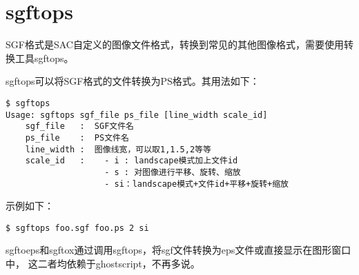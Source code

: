 \section{sgftops}
\label{sec:sgftops}
\label{sec:sgftoeps}
\label{sec:sgftox}

SGF格式是SAC自定义的图像文件格式，转换到常见的其他图像格式，需要使用转换工具sgftops。

sgftops可以将SGF格式的文件转换为PS格式。其用法如下：
\begin{lstlisting}[style=Shell]
$ sgftops
Usage: sgftops sgf_file ps_file [line_width scale_id]
	sgf_file   :  SGF文件名
	ps_file    :  PS文件名
	line_width :  图像线宽，可以取1,1.5,2等等
	scale_id   :  	- i : landscape模式加上文件id
					- s : 对图像进行平移、旋转、缩放
					- si：landscape模式+文件id+平移+旋转+缩放
\end{lstlisting}

示例如下：
\begin{lstlisting}[style=Shell]
$ sgftops foo.sgf foo.ps 2 si
\end{lstlisting}

sgftoeps和sgftox通过调用sgftops，将sgf文件转换为eps文件或直接显示在图形窗口中，
这二者均依赖于ghostscript，不再多说。